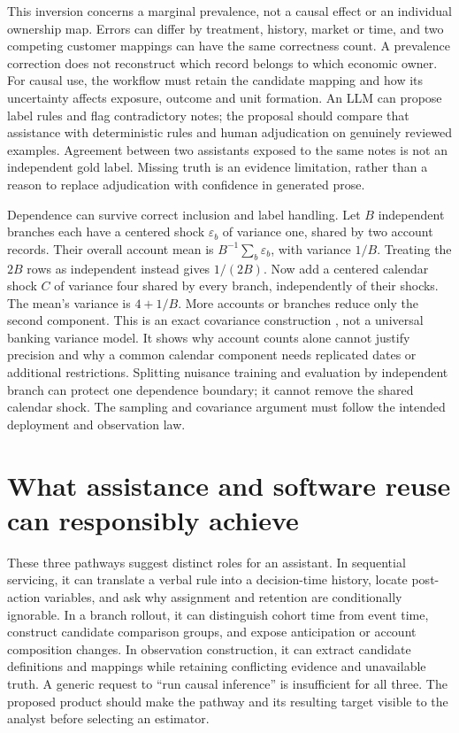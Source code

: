 This inversion concerns a marginal prevalence, not a causal effect or an
individual ownership map. Errors can differ by treatment, history, market or
time, and two competing customer mappings can have the same correctness
count. A prevalence correction does not reconstruct which record belongs to
which economic owner. For causal use, the workflow must retain the candidate
mapping and how its uncertainty affects exposure, outcome and unit formation.
An LLM can propose label rules and flag contradictory notes; the proposal
should compare that assistance with deterministic rules and human adjudication
on genuinely reviewed examples. Agreement between two assistants exposed to
the same notes is not an independent gold label. Missing truth is an evidence
limitation, rather than a reason to replace adjudication with confidence in
generated prose.

Dependence can survive correct inclusion and label handling. Let $B$ independent
branches each have a centered shock $\varepsilon_b$ of variance one, shared
by two account records. Their overall account mean is
$B^{-1}\sum_b\varepsilon_b$, with variance $1/B$. Treating the $2B$ rows as
independent instead gives $1/(2B)$. Now add a centered calendar shock $C$ of
variance four shared by every branch, independently of their shocks. The
mean's variance is $4+1/B$. More accounts or branches reduce only the second
component. This is an exact covariance construction
\citep{exec14_workflow_oracle}, not a universal banking variance model. It
shows why account counts alone cannot justify precision and why a common
calendar component needs replicated dates or additional restrictions.
Splitting nuisance training and evaluation by independent branch can protect
one dependence boundary; it cannot remove the shared calendar shock. The
sampling and covariance argument must follow the intended deployment and
observation law.

\section{What assistance and software reuse can responsibly achieve}
\label{exec14:l5-handoffs}

These three pathways suggest distinct roles for an assistant. In sequential
servicing, it can translate a verbal rule into a decision-time history, locate
post-action variables, and ask why assignment and retention are conditionally
ignorable. In a branch rollout, it can distinguish cohort time from event time,
construct candidate comparison groups, and expose anticipation or account
composition changes. In observation construction, it can extract candidate
definitions and mappings while retaining conflicting evidence and unavailable
truth. A generic request to ``run causal inference'' is insufficient for all
three. The proposed product should make the pathway and its resulting target
visible to the analyst before selecting an estimator.

